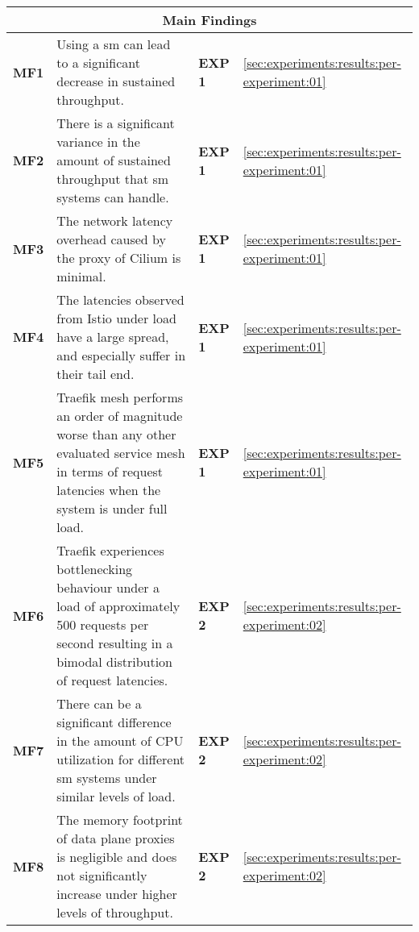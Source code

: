 \begin{table}[t]
\begin{tabularx}{\linewidth}{@{}lXll@{}}
\toprule
\multicolumn{4}{c}{\textbf{Main Findings}} \\
\midrule

\textbf{MF1} &
Using a \gls{sm} can lead to a significant decrease in sustained throughput. &
\textbf{EXP 1} &
\cref{sec:experiments:results:per-experiment:01} \\
\midrule
  
\textbf{MF2} &
There is a significant variance in the amount of sustained throughput that \gls{sm} systems can handle. &
\textbf{EXP 1} &
\cref{sec:experiments:results:per-experiment:01} \\
\midrule 
  
\textbf{MF3} &
The network latency overhead caused by the proxy of Cilium is minimal. &
\textbf{EXP 1} &
\cref{sec:experiments:results:per-experiment:01} \\
\midrule  
  
\textbf{MF4} &
The latencies observed from Istio under load have a large spread, and especially suffer in their tail end. &
\textbf{EXP 1} &
\cref{sec:experiments:results:per-experiment:01} \\
\midrule    
  
\textbf{MF5} &
Traefik mesh performs an order of magnitude worse than any other evaluated service mesh in terms of request latencies when the system is under full load. &
\textbf{EXP 1} &
\cref{sec:experiments:results:per-experiment:01} \\
\midrule  
  
\textbf{MF6} &
Traefik experiences bottlenecking behaviour under a load of approximately 500 requests per second resulting in a bimodal distribution of request latencies. &
\textbf{EXP 2} &
\cref{sec:experiments:results:per-experiment:02} \\
\midrule  
  
\textbf{MF7} &
There can be a significant difference in the amount of CPU utilization for different \gls{sm} systems under similar levels of load. &
\textbf{EXP 2} &
\cref{sec:experiments:results:per-experiment:02} \\
\midrule  
  
\textbf{MF8} &
The memory footprint of data plane proxies is negligible and does not significantly increase under higher levels of throughput. &
\textbf{EXP 2} &
\cref{sec:experiments:results:per-experiment:02} \\
\midrule  
  

\end{tabularx}
\end{table}
